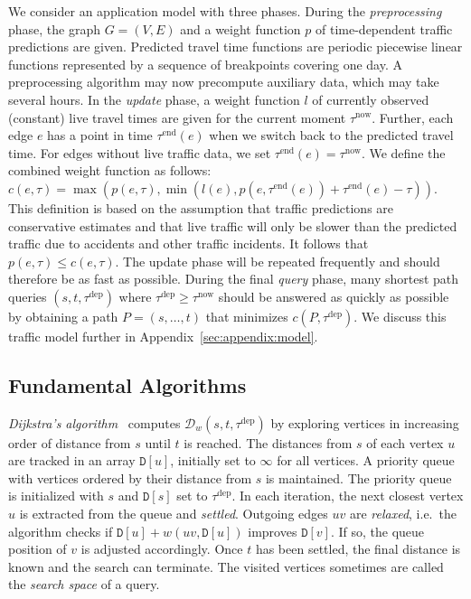 \documentclass[a4paper,UKenglish,cleveref, autoref, thm-restate,anonymous]{lipics-v2021}
\newcommand*{\pred}{p}
\newcommand*{\comb}{c}
\newcommand*{\dist}{\mathcal{D}}
\newcommand*{\tdep}{\tau^{\operatorname{dep}}}
\begin{document}
We consider an application model with three phases.
During the \emph{preprocessing} phase, the graph $G=(V,E)$ and a weight function $\pred$ of time-dependent traffic predictions are given.
Predicted travel time functions are periodic piecewise linear functions represented by a sequence of breakpoints covering one day.
A preprocessing algorithm may now precompute auxiliary data, which may take several hours.
In the \emph{update} phase, a weight function $l$ of currently observed (constant) live travel times are given for the current moment $\tau^{\operatorname{now}}$.
Further, each edge $e$ has a point in time $\tau^{\operatorname{end}}(e)$ when we switch back to the predicted travel time.
For edges without live traffic data, we set $\tau^{\operatorname{end}}(e) = \tau^{\operatorname{now}}$.
We define the combined weight function as follows:
$\comb(e, \tau) = \max(\pred(e, \tau), \min(l(e), \pred(e, \tau^{\operatorname{end}}(e)) + \tau^{\operatorname{end}}(e) - \tau))$.
This definition is based on the assumption that traffic predictions are conservative estimates and that live traffic will only be slower than the predicted traffic due to accidents and other traffic incidents.
It follows that $\pred(e, \tau) \leq \comb(e, \tau)$.
The update phase will be repeated frequently and should therefore be as fast as possible.
During the final \emph{query} phase, many shortest path queries $(s,t,\tdep)$ where $\tdep \geq \tau^{\operatorname{now}}$ should be answered as quickly as possible by obtaining a path $P = (s,\dots,t)$ that minimizes $\comb(P, \tdep)$.
We discuss this traffic model further in Appendix~\ref{sec:appendix:model}.

\subsection{Fundamental Algorithms}

\emph{Dijkstra's algorithm}~\cite{d-ntpcg-59} computes $\dist_w(s,t,\tdep)$ by exploring vertices in increasing order of distance from $s$ until $t$ is reached.
The distances from $s$ of each vertex $u$ are tracked in an array $\mathtt{D}[u]$, initially set to $\infty$ for all vertices.
A priority queue with vertices ordered by their distance from $s$ is maintained.
The priority queue is initialized with $s$ and $\mathtt{D}[s]$ set to $\tdep$.
In each iteration, the next closest vertex $u$ is extracted from the queue and \emph{settled}.
Outgoing edges $uv$ are \emph{relaxed}, i.e.\ the algorithm checks if $\mathtt{D}[u] + w(uv, \mathtt{D}[u])$ improves $\mathtt{D}[v]$.
If so, the queue position of $v$ is adjusted accordingly.
Once $t$ has been settled, the final distance is known and the search can terminate.
The visited vertices sometimes are called the \emph{search space} of a query.
\end{document}
